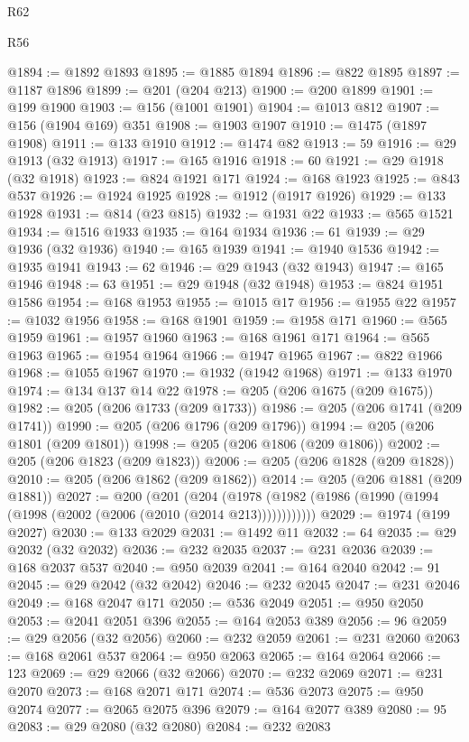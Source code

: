 \begin{lexlean}{R62}
\begin{lexlean}{R56}
\begin{coremodule}
{{{{{{{{{{{{{{{{{{{{{{{{{{{{{{{{{{{{{{{{{{{{{{{{{{{{{{{{{{{{{{{{{{{{{{{{{{{{{{{{{{{{{{{{{{{{{{{{{{{{{{{{{{{{{{{{{{{{{{{{{{{{{{{{{{{{{{{{{{{{{{{{{{{{{{{{{{{{{{{{{{{{{{{{{{{{{{{{{{{{{{{{{{{{{{{{{{{{{{{{{{{{{{{{{{{@1894 := @1892 @1893
@1895 := @1885 @1894
@1896 := @822 @1895
@1897 := @1187 @1896
@1899 := @201 (@204 @213)
@1900 := @200 @1899
@1901 := @199 @1900
@1903 := @156 (@1001 @1901)
@1904 := @1013 @812
@1907 := @156 (@1904 @169) @351
@1908 := @1903 @1907
@1910 := @1475 (@1897 @1908)
@1911 := @133 @1910
@1912 := @1474 @82
@1913 := 59
@1916 := @29 @1913 (@32 @1913)
@1917 := @165 @1916
@1918 := 60
@1921 := @29 @1918 (@32 @1918)
@1923 := @824 @1921 @171
@1924 := @168 @1923
@1925 := @843 @537
@1926 := @1924 @1925
@1928 := @1912 (@1917 @1926)
@1929 := @133 @1928
@1931 := @814 (@23 @815)
@1932 := @1931 @22
@1933 := @565 @1521
@1934 := @1516 @1933
@1935 := @164 @1934
@1936 := 61
@1939 := @29 @1936 (@32 @1936)
@1940 := @165 @1939
@1941 := @1940 @1536
@1942 := @1935 @1941
@1943 := 62
@1946 := @29 @1943 (@32 @1943)
@1947 := @165 @1946
@1948 := 63
@1951 := @29 @1948 (@32 @1948)
@1953 := @824 @1951 @1586
@1954 := @168 @1953
@1955 := @1015 @17
@1956 := @1955 @22
@1957 := @1032 @1956
@1958 := @168 @1901
@1959 := @1958 @171
@1960 := @565 @1959
@1961 := @1957 @1960
@1963 := @168 @1961 @171
@1964 := @565 @1963
@1965 := @1954 @1964
@1966 := @1947 @1965
@1967 := @822 @1966
@1968 := @1055 @1967
@1970 := @1932 (@1942 @1968)
@1971 := @133 @1970
@1974 := @134 @137 @14 @22
@1978 := @205 (@206 @1675 (@209 @1675))
@1982 := @205 (@206 @1733 (@209 @1733))
@1986 := @205 (@206 @1741 (@209 @1741))
@1990 := @205 (@206 @1796 (@209 @1796))
@1994 := @205 (@206 @1801 (@209 @1801))
@1998 := @205 (@206 @1806 (@209 @1806))
@2002 := @205 (@206 @1823 (@209 @1823))
@2006 := @205 (@206 @1828 (@209 @1828))
@2010 := @205 (@206 @1862 (@209 @1862))
@2014 := @205 (@206 @1881 (@209 @1881))
@2027 := @200
    (@201
      (@204 (@1978 (@1982 (@1986 (@1990 (@1994 (@1998 (@2002 (@2006 (@2010 (@2014 @213))))))))))))
@2029 := @1974 (@199 @2027)
@2030 := @133 @2029
@2031 := @1492 @11
@2032 := 64
@2035 := @29 @2032 (@32 @2032)
@2036 := @232 @2035
@2037 := @231 @2036
@2039 := @168 @2037 @537
@2040 := @950 @2039
@2041 := @164 @2040
@2042 := 91
@2045 := @29 @2042 (@32 @2042)
@2046 := @232 @2045
@2047 := @231 @2046
@2049 := @168 @2047 @171
@2050 := @536 @2049
@2051 := @950 @2050
@2053 := @2041 @2051 @396
@2055 := @164 @2053 @389
@2056 := 96
@2059 := @29 @2056 (@32 @2056)
@2060 := @232 @2059
@2061 := @231 @2060
@2063 := @168 @2061 @537
@2064 := @950 @2063
@2065 := @164 @2064
@2066 := 123
@2069 := @29 @2066 (@32 @2066)
@2070 := @232 @2069
@2071 := @231 @2070
@2073 := @168 @2071 @171
@2074 := @536 @2073
@2075 := @950 @2074
@2077 := @2065 @2075 @396
@2079 := @164 @2077 @389
@2080 := 95
@2083 := @29 @2080 (@32 @2080)
@2084 := @232 @2083
}}}}}}}}}}}}}}}}}}}}}}}}}}}}}}}}}}}}}}}}}}}}}}}}}}}}}}}}}}}}}}}}}}}}}}}}}}}}}}}}}}}}}}}}}}}}}}}}}}}}}}}}}}}}}}}}}}}}}}}}}}}}}}}}}}}}}}}}}}}}}}}}}}}}}}}}}}}}}}}}}}}}}}}}}}}}}}}}}}}}}}}}}}}}}}}}}}}}}}}}}}}}}}}}}}}
\end{coremodule}
\end{lexlean}
\end{lexlean}
